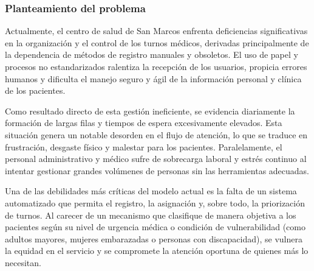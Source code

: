 \subsubsection{Planteamiento del problema}

Actualmente, el centro de salud de San Marcos enfrenta deficiencias significativas en la organización y el control de los turnos médicos, derivadas principalmente de la dependencia de métodos de registro manuales y obsoletos. El uso de papel y procesos no estandarizados ralentiza la recepción de los usuarios, propicia errores humanos y dificulta el manejo seguro y ágil de la información personal y clínica de los pacientes.

Como resultado directo de esta gestión ineficiente, se evidencia diariamente la formación de largas filas y tiempos de espera excesivamente elevados. Esta situación genera un notable desorden en el flujo de atención, lo que se traduce en frustración, desgaste físico y malestar para los pacientes. Paralelamente, el personal administrativo y médico sufre de sobrecarga laboral y estrés continuo al intentar gestionar grandes volúmenes de personas sin las herramientas adecuadas.

Una de las debilidades más críticas del modelo actual es la falta de un sistema automatizado que permita el registro, la asignación y, sobre todo, la priorización de turnos. Al carecer de un mecanismo que clasifique de manera objetiva a los pacientes según su nivel de urgencia médica o condición de vulnerabilidad (como adultos mayores, mujeres embarazadas o personas con discapacidad), se vulnera la equidad en el servicio y se compromete la atención oportuna de quienes más lo necesitan.
